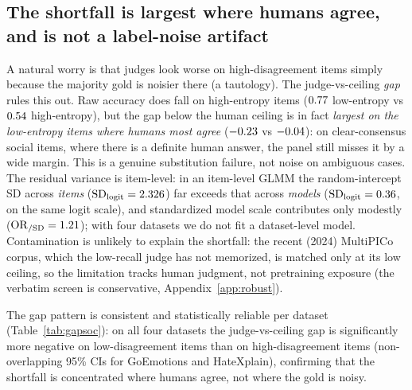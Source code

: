 \subsection{The shortfall is largest where humans agree, and is not a label-noise artifact}
A natural worry is that judges look worse on high-disagreement items simply because the majority gold is noisier
there (a tautology). The judge-vs-ceiling \emph{gap} rules this out. Raw accuracy does fall on high-entropy items
($0.77$ low-entropy vs $0.54$ high-entropy), but the gap below the human ceiling is in fact
\emph{largest on the low-entropy items where humans most agree} ($-0.23$ vs $-0.04$): on clear-consensus
social items, where there is a definite human answer, the panel still misses it by a wide margin. This is a genuine
substitution failure, not noise on ambiguous cases. The residual variance is item-level: in an item-level GLMM the
random-intercept SD across \emph{items} ($\mathrm{SD}_{\text{logit}}=2.326$) far exceeds that across
\emph{models} ($\mathrm{SD}_{\text{logit}}=0.36$, on the same logit scale), and standardized model scale
contributes only modestly ($\mathrm{OR}_{/\mathrm{SD}}=1.21$); with four datasets we do not fit a
dataset-level model. Contamination is unlikely to explain the shortfall: the recent (2024) MultiPICo corpus, which the
low-recall judge has not memorized, is matched only at its low ceiling, so the limitation tracks human judgment, not
pretraining exposure (the verbatim screen is conservative, Appendix~\ref{app:robust}).

\begin{table}[t]\centering\small
\caption{Study 2 disagreement-aware results. Ceiling with annotator-bootstrap 95\% CI; best-model $\kappa$ and
macro-F1; panel accuracy on low- vs high-human-disagreement items; Jensen-Shannon panel-vs-human divergence. Judges
lose accuracy precisely as human disagreement rises.}
\label{tab:socdis}

\end{table}

The gap pattern is consistent and statistically reliable per dataset (Table~\ref{tab:gapsoc}): on all four
datasets the judge-vs-ceiling gap is significantly more negative on low-disagreement items than on high-disagreement
items (non-overlapping 95\% CIs for GoEmotions and HateXplain), confirming that the shortfall is concentrated where
humans agree, not where the gold is noisy.

\begin{table}[t]\centering\small
\caption{Study 2. Judge-vs-ceiling gap (panel accuracy minus human ceiling) by item human-disagreement, per dataset,
with annotator/item-bootstrap 95\% CIs. The gap is largest (most negative) where humans most agree.}
\label{tab:gapsoc}

\end{table}

